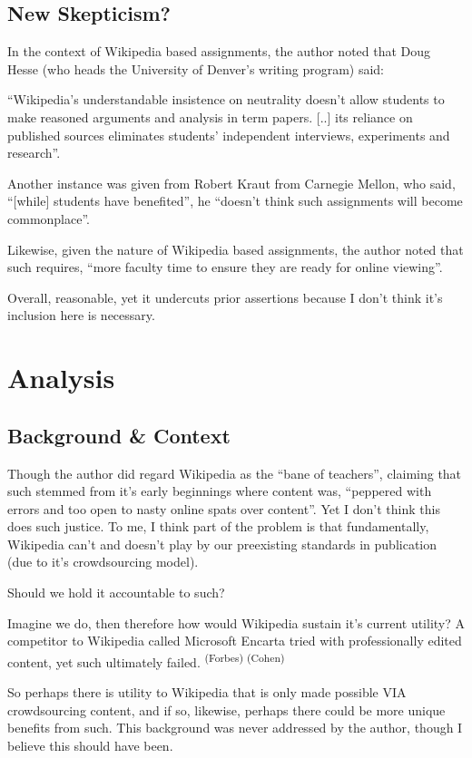 \subsection{New Skepticism?}

In the context of Wikipedia based assignments, the author noted that Doug Hesse (who heads the University of Denver’s writing program) said:

``Wikipedia’s understandable insistence on neutrality doesn’t allow students to make reasoned arguments and analysis in term papers. [..] its reliance on published sources eliminates students’ independent interviews, experiments and research''.

Another instance was given from Robert Kraut from Carnegie Mellon, who said, ``[while] students have benefited'', he ``doesn’t think such assignments will become commonplace''.

Likewise, given the nature of Wikipedia based assignments, the author noted that such requires, ``more faculty time to ensure they are ready for online viewing''.

Overall, reasonable, yet it undercuts prior assertions because I don’t think it’s inclusion here is necessary. 


\section{Analysis}


\subsection{Background \& Context}

Though the author did regard Wikipedia as the ``bane of teachers'', claiming that such stemmed from it's early beginnings where content was, ``peppered with errors and too open to nasty online spats over content''. Yet I don't think this does such justice. To me, I think part of the problem is that fundamentally, Wikipedia can’t and doesn’t play by our preexisting standards in publication (due to it's crowdsourcing model).

Should we hold it accountable to such?

Imagine we do, then therefore how would Wikipedia sustain it's current utility?
A competitor to Wikipedia called Microsoft Encarta tried with professionally edited content, yet such ultimately failed. \textsuperscript{(Forbes) (Cohen)}

So perhaps there is utility to Wikipedia that is only made possible VIA crowdsourcing content, and if so, likewise, perhaps there could be more unique benefits from such. This background was never addressed by the author, though I believe this should have been. 


